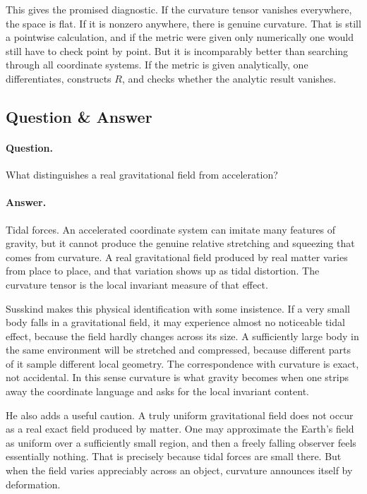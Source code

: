 This gives the promised diagnostic. If the curvature tensor vanishes everywhere, the space is flat. If it is nonzero anywhere, there is genuine curvature. That is still a pointwise calculation, and if the metric were given only numerically one would still have to check point by point. But it is incomparably better than searching through all coordinate systems. If the metric is given analytically, one differentiates, constructs \(R\), and checks whether the analytic result vanishes.

\subsection{Question \& Answer}

\paragraph{Question.} What distinguishes a real gravitational field from acceleration?

\paragraph{Answer.} Tidal forces. An accelerated coordinate system can imitate many features of gravity, but it cannot produce the genuine relative stretching and squeezing that comes from curvature. A real gravitational field produced by real matter varies from place to place, and that variation shows up as tidal distortion. The curvature tensor is the local invariant measure of that effect.

Susskind makes this physical identification with some insistence. If a very small body falls in a gravitational field, it may experience almost no noticeable tidal effect, because the field hardly changes across its size. A sufficiently large body in the same environment will be stretched and compressed, because different parts of it sample different local geometry. The correspondence with curvature is exact, not accidental. In this sense curvature is what gravity becomes when one strips away the coordinate language and asks for the local invariant content.

He also adds a useful caution. A truly uniform gravitational field does not occur as a real exact field produced by matter. One may approximate the Earth's field as uniform over a sufficiently small region, and then a freely falling observer feels essentially nothing. That is precisely because tidal forces are small there. But when the field varies appreciably across an object, curvature announces itself by deformation.


